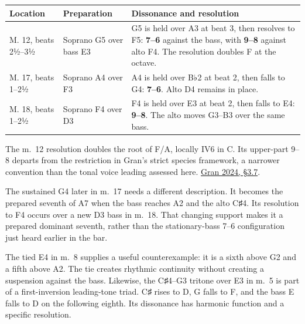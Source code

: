 \documentclass[11pt,a4paper]{article}
\begin{document}
{\def\LTcaptype{table}
\par\addvspace{\LTpre}
{\small\noindent
\begin{tabular}{@{}
  >{\raggedright\arraybackslash}p{}
  >{\raggedright\arraybackslash}p{}
  >{\raggedright\arraybackslash}p{}@{}}
\toprule\noalign{}
\begin{minipage}[b]{\linewidth}\raggedright
Location
\end{minipage} & \begin{minipage}[b]{\linewidth}\raggedright
Preparation
\end{minipage} & \begin{minipage}[b]{\linewidth}\raggedright
Dissonance and resolution
\end{minipage} \\
\midrule\noalign{}

M. 12, beats 2½--3½ & Soprano G5 over bass E3 & G5 is held over A3 at beat 3, then resolves to F5: \textbf{7--6} against the bass, with \textbf{9--8} against alto F4. The resolution doubles F at the octave. \\
M. 17, beats 1--2½ & Soprano A4 over F3 & A4 is held over B♭2 at beat 2, then falls to G4: \textbf{7--6}. Alto D4 remains in place. \\
M. 18, beats 1--2½ & Soprano F4 over D3 & F4 is held over E3 at beat 2, then falls to E4: \textbf{9--8}. The alto moves G3--B3 over the same bass. \\
\bottomrule
\end{tabular}
\par}
\addvspace{\LTpost}
}

The m.~12 resolution doubles the root of F/A, locally IV6 in C. Its upper-part 9--8 departs from the restriction in Gran's strict species framework, a narrower convention than the tonal voice leading assessed here. \href{https://mtosmt.org/issues/mto.24.30.2/mto.24.30.2.gran.html}{Gran 2024, §3.7}.

The sustained G4 later in m.~17 needs a different description. It becomes the prepared seventh of A7 when the bass reaches A2 and the alto C♯4. Its resolution to F4 occurs over a new D3 bass in m.~18. That changing support makes it a prepared dominant seventh, rather than the stationary-bass 7--6 configuration just heard earlier in the bar.

The tied E4 in m.~8 supplies a useful counterexample: it is a sixth above G2 and a fifth above A2. The tie creates rhythmic continuity without creating a suspension against the bass. Likewise, the C♯4--G3 tritone over E3 in m.~5 is part of a first-inversion leading-tone triad. C♯ rises to D, G falls to F, and the bass E falls to D on the following eighth. Its dissonance has harmonic function and a specific resolution.
\end{document}
